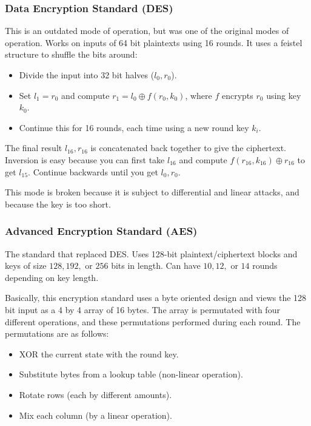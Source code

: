 \documentclass[psamsfonts]{amsart}
\begin{document}
\subsubsection{Data Encryption Standard (DES)}

This is an outdated mode of operation, but was one of the original modes of operation. Works on inputs of 64 bit plaintexts using 16 rounds. It uses a feistel structure to shuffle the bits around:
\begin{itemize}
  \item Divide the input into 32 bit halves ($l_0, r_0$).
  \item Set $l_1 = r_0$ and compute $r_1 = l_0 \oplus f(r_0, k_0)$, where $f$ encrypts $r_0$ using key $k_0$.
  \item Continue this for 16 rounds, each time using a new round key $k_i$.
\end{itemize}

The final result $l_{16}, r_{16}$ is concatenated back together to give the ciphertext. Inversion is easy because you can first take $l_{16}$ and compute $f(r_{16}, k_{16}) \oplus r_{16}$ to get $l_{15}$. Continue backwards until you get $l_0, r_0$.

This mode is broken because it is subject to differential and linear attacks, and because the key is too short.

\subsubsection{Advanced Encryption Standard (AES)}

The standard that replaced DES. Uses 128-bit plaintext/ciphertext blocks and keys of size $128, 192,$ or $256$ bits in length. Can have $10, 12,$ or $14$ rounds depending on key length.

Basically, this encryption standard uses a byte oriented design and views the 128 bit input as a 4 by 4 array of 16 bytes. The array is permutated with four different operations, and these permutations performed during each round. The permutations are as follows:
\begin{itemize}
  \item XOR the current state with the round key.
  \item Substitute bytes from a lookup table (non-linear operation).
  \item Rotate rows (each by different amounts).
  \item Mix each column (by a linear operation).
\end{itemize}
\end{document}
